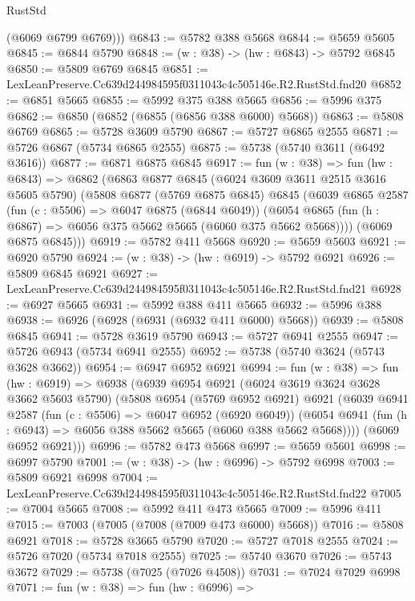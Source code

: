\begin{lexlean}{RustStd}
\begin{coremodule}
        (@6069 @6799 @6769)))
@6843 := @5782 @388 @5668
@6844 := @5659 @5605
@6845 := @6844 @5790
@6848 := (w : @38) -> (hw : @6843) -> @5792 @6845
@6850 := @5809 @6769 @6845
@6851 := LexLeanPreserve.Cc639d244984595f0311043c4c505146e.R2.RustStd.fnd20
@6852 := @6851 @5665
@6855 := @5992 @375 @388 @5665
@6856 := @5996 @375
@6862 := @6850 (@6852 (@6855 (@6856 @388 @6000) @5668))
@6863 := @5808 @6769
@6865 := @5728 @3609 @5790
@6867 := @5727 @6865 @2555
@6871 := @5726 @6867 (@5734 @6865 @2555)
@6875 := @5738 (@5740 @3611 (@6492 @3616))
@6877 := @6871 @6875 @6845
@6917 := fun (w : @38) =>
  fun (hw : @6843) =>
  @6862
    (@6863
      @6877
      @6845
      (@6024 @3609 @3611 @2515 @3616 @5605 @5790)
      (@5808
        @6877
        (@5769 @6875 @6845)
        @6845
        (@6039
          @6865
          @2587
          (fun (c : @5506) => @6047 @6875 (@6844 @6049))
          (@6054 @6865 (fun (h : @6867) => @6056 @375 @5662 @5665 (@6060 @375 @5662 @5668))))
        (@6069 @6875 @6845)))
@6919 := @5782 @411 @5668
@6920 := @5659 @5603
@6921 := @6920 @5790
@6924 := (w : @38) -> (hw : @6919) -> @5792 @6921
@6926 := @5809 @6845 @6921
@6927 := LexLeanPreserve.Cc639d244984595f0311043c4c505146e.R2.RustStd.fnd21
@6928 := @6927 @5665
@6931 := @5992 @388 @411 @5665
@6932 := @5996 @388
@6938 := @6926 (@6928 (@6931 (@6932 @411 @6000) @5668))
@6939 := @5808 @6845
@6941 := @5728 @3619 @5790
@6943 := @5727 @6941 @2555
@6947 := @5726 @6943 (@5734 @6941 @2555)
@6952 := @5738 (@5740 @3624 (@5743 @3628 @3662))
@6954 := @6947 @6952 @6921
@6994 := fun (w : @38) =>
  fun (hw : @6919) =>
  @6938
    (@6939
      @6954
      @6921
      (@6024 @3619 @3624 @3628 @3662 @5603 @5790)
      (@5808
        @6954
        (@5769 @6952 @6921)
        @6921
        (@6039
          @6941
          @2587
          (fun (c : @5506) => @6047 @6952 (@6920 @6049))
          (@6054 @6941 (fun (h : @6943) => @6056 @388 @5662 @5665 (@6060 @388 @5662 @5668))))
        (@6069 @6952 @6921)))
@6996 := @5782 @473 @5668
@6997 := @5659 @5601
@6998 := @6997 @5790
@7001 := (w : @38) -> (hw : @6996) -> @5792 @6998
@7003 := @5809 @6921 @6998
@7004 := LexLeanPreserve.Cc639d244984595f0311043c4c505146e.R2.RustStd.fnd22
@7005 := @7004 @5665
@7008 := @5992 @411 @473 @5665
@7009 := @5996 @411
@7015 := @7003 (@7005 (@7008 (@7009 @473 @6000) @5668))
@7016 := @5808 @6921
@7018 := @5728 @3665 @5790
@7020 := @5727 @7018 @2555
@7024 := @5726 @7020 (@5734 @7018 @2555)
@7025 := @5740 @3670
@7026 := @5743 @3672
@7029 := @5738 (@7025 (@7026 @4508))
@7031 := @7024 @7029 @6998
@7071 := fun (w : @38) =>
  fun (hw : @6996) =>

\end{coremodule}
\end{lexlean}
